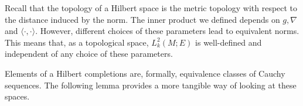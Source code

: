 \begin{obs}
    Recall that the topology of a Hilbert space is the metric topology with respect to the distance induced by the norm. The inner product we defined depends on \(g, \nabla\) and \(\langle\cdot, \cdot \rangle\). However, different choices of these parameters lead to equivalent norms. This means that, as a topological space, \(L^2_k(M;E)\) is well-defined and independent of any choice of these parameters.
\end{obs}
Elements of a Hilbert completions are, formally, equivalence classes of Cauchy sequences. The following lemma provides a more tangible way of looking at these spaces.

